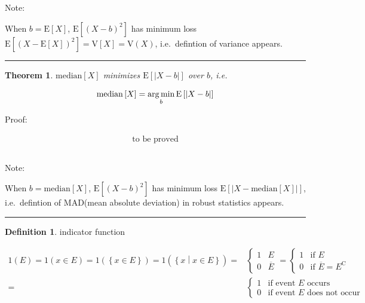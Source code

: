 \documentclass[
]{book}
\newtheorem{theorem}{Theorem}[chapter]
\theoremstyle{definition}
\newtheorem{definition}{Definition}[chapter]
\theoremstyle{definition}
\theoremstyle{definition}
\theoremstyle{definition}
\theoremstyle{remark}
\begin{document}
\[
\tag*{$\Box$}
\]

Note:

When \(b=\mathrm{E}\left[X\right]\), \(\mathrm{E}\left[\left(X-b\right)^{2}\right]\) has minimum loss \(\mathrm{E}\left[\left(X-\mathrm{E}\left[X\right]\right)^{2}\right]=\mathrm{V}\left[X\right]=\mathrm{V}\left(X\right)\), i.e.~defintion of variance appears.

\begin{center}\rule{0.5\linewidth}{0.5pt}\end{center}

\begin{theorem}
\protect\hypertarget{thm:unnamed-chunk-21}{}\label{thm:unnamed-chunk-21}\(\mathrm{median}\left[X\right]\) minimizes \(\mathrm{E}\left[\left|X-b\right|\right]\) over \(b\), i.e.
\end{theorem}

\[
\mathrm{median}\left[X\right]=\underset{b}{\arg\min}\thinspace\mathrm{E}\left[\left|X-b\right|\right]
\]

Proof:

\[
\begin{aligned}
\text{to be proved}
\end{aligned}
\]

\[
\tag*{$\Box$}
\]

Note:

When \(b=\mathrm{median}\left[X\right]\), \(\mathrm{E}\left[\left(X-b\right)^{2}\right]\) has minimum loss \(\mathrm{E}\left[\left|X-\mathrm{median}\left[X\right]\right|\right]\), i.e.~defintion of MAD(mean absolute deviation) in robust statistics appears.

\begin{center}\rule{0.5\linewidth}{0.5pt}\end{center}

\begin{definition}
\protect\hypertarget{def:unnamed-chunk-22}{}\label{def:unnamed-chunk-22}indicator function
\end{definition}

\[
\begin{aligned}
1\left(E\right)=1\left(x\in E\right)=1\left(\left\{ x\in E\right\} \right)=1\left(\left\{ x\middle|x\in E\right\} \right)= & \begin{cases}
1 & E\\
0 & \overline{E}
\end{cases}=\begin{cases}
1 & \text{if }E\\
0 & \text{if }\overline{E}=E^{\mathrm{C}}
\end{cases}\\
= & \begin{cases}
1 & \text{if event }E\text{ occurs}\\
0 & \text{if event }E\text{ does not occur}
\end{cases}
\end{aligned}
\]
\end{document}
